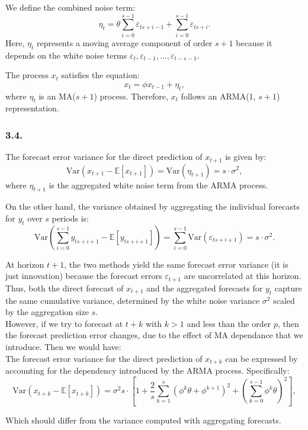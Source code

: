 \documentclass{article}
\begin{document}
We define the combined noise term:
\[
\eta_t = \theta \sum_{i=0}^{s-1} \varepsilon_{ts+i-1} + \sum_{i=0}^{s-1} \varepsilon_{ts+i}.
\]
Here, \( \eta_t \) represents a moving average component of order \( s+1 \) because it depends on the white noise terms \( \varepsilon_t, \varepsilon_{t-1}, \ldots, \varepsilon_{t-s-1} \).

The process \( x_t \) satisfies the equation:
\[
x_t = \phi x_{t-1} + \eta_t,
\]
where \( \eta_t \) is an MA(\( s+1 \)) process. Therefore, \( x_t \) follows an ARMA(1, \( s+1 \)) representation.




\subsubsection*{3.4.}
The forecast error variance for the direct prediction of \( x_{t+1} \) is given by:
\[
\text{Var}(x_{t+1} - \mathbb{E}[x_{t+1}]) = \text{Var}(\eta_{t+1}) = s \cdot \sigma^2,
\]
where \( \eta_{t+1} \) is the aggregated white noise term from the ARMA process.

On the other hand, the variance obtained by aggregating the individual forecasts for \( y_t \) over \( s \) periods is:
\[
\text{Var}\left(\sum_{i=0}^{s-1} y_{ts+i+1} - \mathbb{E}[y_{ts+i+1}]\right) = \sum_{i=0}^{s-1} \text{Var}(\varepsilon_{ts+i+1}) = s \cdot \sigma^2.
\]

At horizon \( t+1 \), the two methods yield the same forecast error variance (it is just innovation) because the forecast errors \( \varepsilon_{t+1} \) are uncorrelated at this horizon. Thus, both the direct forecast of \( x_{t+1} \) and the aggregated forecasts for \( y_t \) capture the same cumulative variance, determined by the white noise variance \( \sigma^2 \) scaled by the aggregation size \( s \). \\

However, if we try to forecast at $t+k$ with $k>1$ and less than the order $p$, then the forecast prediction error changes, due to the 
effect of MA dependance that we introduce. Then we would have: \\


The forecast error variance for the direct prediction of \( x_{t+k} \) can be expressed by accounting for the dependency introduced by the ARMA process. Specifically:
\[
\text{Var}(x_{t+k} - \mathbb{E}[x_{t+k}]) = \sigma^2 s \cdot \left[ 1 + \frac{2}{s} \sum_{k=1}^{s} (\phi^k \theta + \phi^{k+1})^2 + \left( \sum_{k=0}^{s-1} \phi^k \theta \right)^2 \right],
\]

Which should differ from the variance computed with aggregating forecasts.
\end{document}
